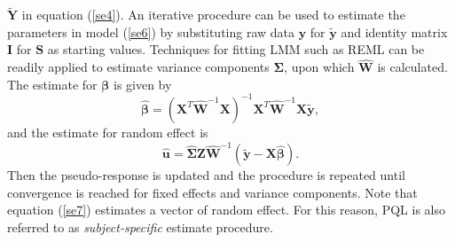 $\tilde{\bm Y }$ in equation (\ref{se4}). An iterative procedure can be used to estimate the
parameters in model (\ref{se6}) by substituting raw data $\bm y$ for $\tilde{\bm y}$  and identity
matrix $\bm I$ for $\bm S$ as starting values. Techniques for fitting LMM such as REML can be
readily applied to estimate variance components $\bm \Sigma$, upon which $\hat{\bm W}$ is
calculated. The estimate for $\bm \beta$ is given by
\begin{equation}
	\hat{\bm\beta} = (\bm X^T\hat{\bm W}^{-1} \bm X)^{-1}\bm X^T\hat{\bm W}^{-1}\bm X \tilde{\bm y},
\end{equation}
and the estimate for random effect is 
\begin{equation}\label{se7}
	\hat{\bm u} = \hat{\bm\Sigma } \bm Z \hat{\bm W}^{-1} (\tilde{\bm y}-\bm {X} \hat{\bm \beta}).
\end{equation}
Then the pseudo-response is updated and the procedure is repeated until convergence is reached for
fixed effects and variance components.  Note that equation (\ref{se7}) estimates a vector of random
effect. For this reason, PQL is also referred to as \textit{subject-specific} estimate procedure. 

